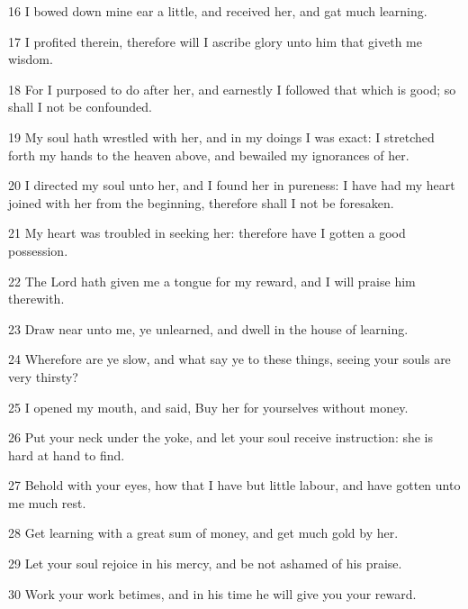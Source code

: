 \par 16 I bowed down mine ear a little, and received her, and gat much learning.
\par 17 I profited therein, therefore will I ascribe glory unto him that giveth me wisdom.
\par 18 For I purposed to do after her, and earnestly I followed that which is good; so shall I not be confounded.
\par 19 My soul hath wrestled with her, and in my doings I was exact: I stretched forth my hands to the heaven above, and bewailed my ignorances of her.
\par 20 I directed my soul unto her, and I found her in pureness: I have had my heart joined with her from the beginning, therefore shall I not be foresaken.
\par 21 My heart was troubled in seeking her: therefore have I gotten a good possession.
\par 22 The Lord hath given me a tongue for my reward, and I will praise him therewith.
\par 23 Draw near unto me, ye unlearned, and dwell in the house of learning.
\par 24 Wherefore are ye slow, and what say ye to these things, seeing your souls are very thirsty?
\par 25 I opened my mouth, and said, Buy her for yourselves without money.
\par 26 Put your neck under the yoke, and let your soul receive instruction: she is hard at hand to find.
\par 27 Behold with your eyes, how that I have but little labour, and have gotten unto me much rest.
\par 28 Get learning with a great sum of money, and get much gold by her.
\par 29 Let your soul rejoice in his mercy, and be not ashamed of his praise.
\par 30 Work your work betimes, and in his time he will give you your reward.

